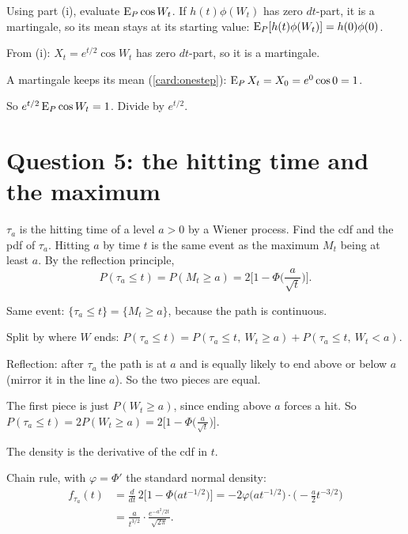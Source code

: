 \begin{problem}[Q4(b)(ii)]
Using part (i), evaluate $\operatorname{E}_P\cos W_t$.
\cardsays If $h(t)\phi(W_t)$ has zero $dt$-part, it is a martingale, so its mean stays at its starting value: $\operatorname{E}_P[h(t)\phi(W_t)]=h(0)\phi(0)$.
\working
\begin{steps}
\item From (i): $X_t=e^{t/2}\cos W_t$ has zero $dt$-part, so it is a martingale.
\item A martingale keeps its mean (\cref{card:onestep}): $\operatorname{E}_PX_t=X_0=e^0\cos0=1$.
\item So $e^{t/2}\operatorname{E}_P\cos W_t=1$. Divide by $e^{t/2}$.
\end{steps}
\end{problem}

\section{Question 5: the hitting time and the maximum}

\begin{problem}[Q5(a)]
$\tau_a$ is the hitting time of a level $a>0$ by a Wiener process. Find the cdf and the pdf of $\tau_a$.
\cardsays Hitting $a$ by time $t$ is the same event as the maximum $M_t$ being at least $a$. By the reflection principle,
\[
P(\tau_a\le t)=P(M_t\ge a)=2\Big[1-\Phi\Big(\frac{a}{\sqrt t}\Big)\Big].
\]
\working
\begin{steps}
\item Same event: $\{\tau_a\le t\}=\{M_t\ge a\}$, because the path is continuous.
\item Split by where $W$ ends: $P(\tau_a\le t)=P(\tau_a\le t,\ W_t\ge a)+P(\tau_a\le t,\ W_t<a)$.
\item Reflection: after $\tau_a$ the path is at $a$ and is equally likely to end above or below $a$ (mirror it in the line $a$). So the two pieces are equal.
\item The first piece is just $P(W_t\ge a)$, since ending above $a$ forces a hit. So $P(\tau_a\le t)=2P(W_t\ge a)=2\big[1-\Phi\big(\frac a{\sqrt t}\big)\big]$.
\end{steps}
\cardsays The density is the derivative of the cdf in $t$.
\begin{steps}[resume]
\item Chain rule, with $\varphi=\Phi'$ the standard normal density:
\[
\begin{aligned}
f_{\tau_a}(t)&=\frac{d}{dt}\,2\Big[1-\Phi\big(at^{-1/2}\big)\Big]=-2\varphi\big(at^{-1/2}\big)\cdot\Big(-\frac a2t^{-3/2}\Big)\\
&=\frac{a}{t^{3/2}}\cdot\frac{e^{-a^2/2t}}{\sqrt{2\pi}}.
\end{aligned}
\]
\end{steps}
\end{problem}

